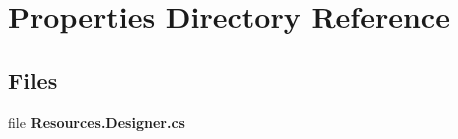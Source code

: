\section{Properties Directory Reference}
\label{dir_d051c76eebdc544d9c3d734575641c72}
\subsection*{Files}
\begin{DoxyCompactItemize}
\item 
file \textbf{ Resources.\+Designer.\+cs}
\end{DoxyCompactItemize}
